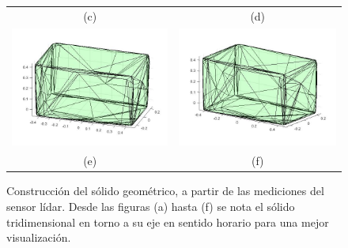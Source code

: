\begin{figure}[ht!]
\begin{tabular}{cc}
        (c)&(d)\\
        \includegraphics[width=.50\textwidth]{images/5.jpg}&
        \includegraphics[width=.50\textwidth]{images/6.jpg}\\
        (e)&(f)
    \end{tabular}
  \captionsetup{font=footnotesize}
    \caption{\label{fig:Caja3D}Construcción del sólido geométrico, a partir de 
    las mediciones del sensor lídar. Desde las figuras (a) hasta (f) se nota 
    el sólido tridimensional en torno a su eje en sentido horario para una 
    mejor visualización.}
\end{figure}


